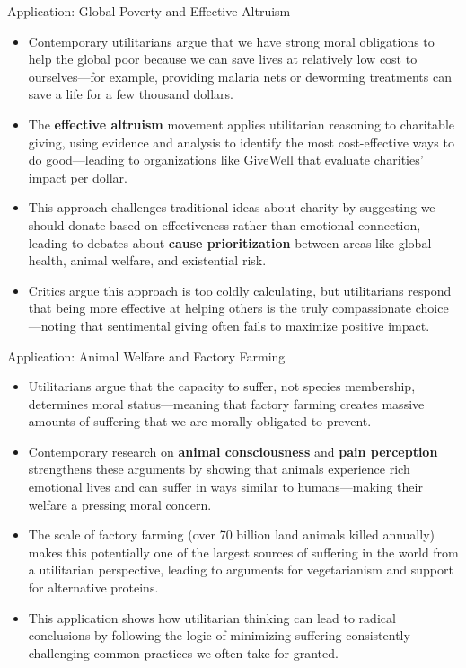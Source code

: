 \documentclass[aspectratio=169]{beamer}
\begin{document}
\begin{frame}{Application: Global Poverty and Effective Altruism}
    \begin{itemize}
        \item Contemporary utilitarians argue that we have strong moral obligations to help the global poor because we can save lives at relatively low cost to ourselves—for example, providing malaria nets or deworming treatments can save a life for a few thousand dollars.
        
        \item The \textbf{effective altruism} movement applies utilitarian reasoning to charitable giving, using evidence and analysis to identify the most cost-effective ways to do good—leading to organizations like GiveWell that evaluate charities' impact per dollar.
        
        \item This approach challenges traditional ideas about charity by suggesting we should donate based on effectiveness rather than emotional connection, leading to debates about \textbf{cause prioritization} between areas like global health, animal welfare, and existential risk.
        
        \item Critics argue this approach is too coldly calculating, but utilitarians respond that being more effective at helping others is the truly compassionate choice—noting that sentimental giving often fails to maximize positive impact.
    \end{itemize}
\end{frame}

\begin{frame}{Application: Animal Welfare and Factory Farming}
    \begin{itemize}
        \item Utilitarians argue that the capacity to suffer, not species membership, determines moral status—meaning that factory farming creates massive amounts of suffering that we are morally obligated to prevent.
        
        \item Contemporary research on \textbf{animal consciousness} and \textbf{pain perception} strengthens these arguments by showing that animals experience rich emotional lives and can suffer in ways similar to humans—making their welfare a pressing moral concern.
        
        \item The scale of factory farming (over 70 billion land animals killed annually) makes this potentially one of the largest sources of suffering in the world from a utilitarian perspective, leading to arguments for vegetarianism and support for alternative proteins.
        
        \item This application shows how utilitarian thinking can lead to radical conclusions by following the logic of minimizing suffering consistently—challenging common practices we often take for granted.
    \end{itemize}
\end{frame}
\end{document}
